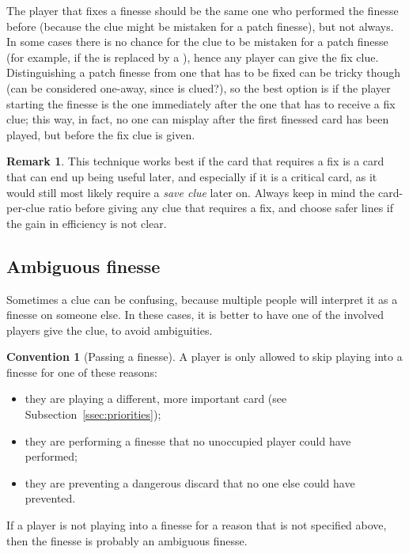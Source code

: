 \documentclass[a4paper]{article}
\theoremstyle{plain}
\theoremstyle{definition}
\newtheorem{remark}[theorem]{Remark}
\newtheorem{convention}[theorem]{Convention}
\begin{document}
The player that fixes a finesse should be the same one who performed the finesse before (because the clue might be mistaken for a patch finesse), but not always. In some cases there is no chance for the clue to be mistaken for a patch finesse (for example, if the  is replaced by a ), hence any player can give the fix clue. Distinguishing a patch finesse from one that has to be fixed can be tricky though (can  be considered one-away, since  is clued?), so the best option is if the player starting the finesse is the one immediately after the one that has to receive a fix clue; this way, in fact, no one can misplay after the first finessed card has been played, but before the fix clue is given.

\begin{remark}
	This technique works best if the card that requires a fix is a card that can end up being useful later, and especially if it is a critical card, as it would still most likely require a \emph{save clue} later on. Always keep in mind the card-per-clue ratio before giving any clue that requires a fix, and choose safer lines if the gain in efficiency is not clear.
\end{remark}

\subsection{Ambiguous finesse}

Sometimes a clue can be confusing, because multiple people will interpret it as a finesse on someone else. In these cases, it is better to have one of the involved players give the clue, to avoid ambiguities.

\begin{convention}[Passing a finesse]
	A player is only allowed to skip playing into a finesse for one of these reasons:
	
	\begin{itemize}
		\item they are playing a different, more important card (see Subsection~\ref{ssec:priorities});
		\item they are performing a finesse that no unoccupied player could have performed;
		\item they are preventing a dangerous discard that no one else could have prevented.
	\end{itemize}

	If a player is not playing into a finesse for a reason that is not specified above, then the finesse is probably an ambiguous finesse.
\end{convention}
\end{document}
